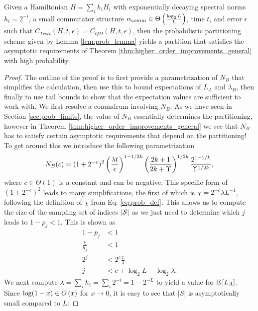 \begin{theorem} \label{thm:exponential_decay}
    Given a Hamiltonian $H = \sum_i h_i H_i$ with exponentially decaying spectral norms $h_i = 2^{-i}$, a small commutator structure $\alpha_{comm} \in \Theta \left( \frac{\log_2 L}{L} \right)$, time $t$, and error $\epsilon$ such that $C_{Trott}(H, t, \epsilon) = C_{QD}(H,t,\epsilon)$, then the probabilistic partitioning scheme given by Lemma \ref{lem:prob_lemma} yields a partition that satisfies the asymptotic requirements of Theorem \ref{thm:higher_order_improvements_general} with high probability.
\end{theorem}
\begin{proof}
    The outline of the proof is to first provide a parametrization of $N_B$ that simplifies the calculation, then use this to bound expectations of $L_A$ and $\lambda_B$, then finally to use tail bounds to show that the expectation values are sufficient to work with. We first resolve a conundrum involving $N_B$. As we have seen in Section \ref{sec:prob_limits}, the value of $N_B$ essentially determines the partitioning, however in Theorem \ref{thm:higher_order_improvements_general} we see that $N_B$ has to satisfy certain asymptotic requirements that depend on the partitioning! To get around this we introduce the following parametrization
    \begin{equation}
        N_B(c) = (1 + 2^{-c})^2 \left( \frac{\lambda t}{\epsilon} \right)^{1 - 1/2k} \left( \frac{2k+1}{2k + \Upsilon} \right)^{1/2k} \frac{2^{1-1/k}}{\Upsilon^{1/2k}}, \label{eq:nb_parametrization}
    \end{equation}
    where $c \in \Theta(1)$ is a constant and can be negative. This specific form of $(1+2^{-c})^2$ leads to many simplifications, the first of which is $\chi = 2^{-c} \lambda L^{-1}$, following the definition of $\chi$ from Eq. \eqref{eq:prob_def}. This allows us to compute the size of the sampling set of indices $|\mathcal{S}|$ as we just need to determine which $j$ leads to $1 - p_j < 1$. This is shown as
\begin{align}
    1 - p_j &< 1 \\
    \frac{\chi }{h_j} &< 1 \\
    2^j &< 2^c \frac{L}{\lambda} \\
    j &< c + \log_2 {L} - \log_2{\lambda}.
\end{align}
We next compute $\lambda = \sum_i h_i = \sum_{i} 2^{-i} = 1 - 2^{-L}$ to yield a value for $\mathbb{E}\left[ L_A \right]$. Since $\log (1-x) \in O\left( x \right)$ for $x \to 0$, it is easy to see that $|S|$ is asymptotically small compared to $L$:

\end{proof}
